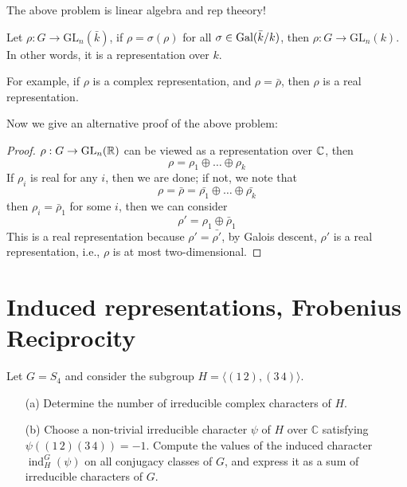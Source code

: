 \begin{warn}
    The above problem is linear algebra and rep theeory!
\end{warn}


\begin{prop}
    Let $\rho:G\to\text{GL}_n(\bar{k})$, if $\rho=\sigma(\rho)$ for all $\sigma\in\text{Gal}(\bar{k}/k)$, then $\rho: G\to\text{GL}_n(k)$. In other words, it is a representation over $k$. 

    For example, if $\rho$ is a complex representation, and $\rho=\bar{\rho}$, then $\rho$ is a real representation.
\end{prop}


Now we give an alternative proof of the above problem:
\begin{proof}
    $\rho:G\to\text{GL}_n(\mathbb{R})$ can be viewed as a representation over $\mathbb{C}$, then 
    \begin{equation*}
        \rho=\rho_1\oplus\dots\oplus\rho_k
    \end{equation*}
    If $\rho_i$ is real for any $i$, then we are done; if not, we note that 
    \begin{equation*}
        \rho=\bar{\rho}=\bar{\rho_1}\oplus\dots\oplus\bar{\rho_k}
    \end{equation*}
    then $\rho_i=\bar{\rho}_1$ for some $i$, then we can consider 
    \begin{equation*}
        \rho'=\rho_1\oplus\bar{\rho}_1
    \end{equation*}
    This is a real representation because $\rho'=\bar{\rho'}$, by Galois descent, $\rho'$ is a real representation, i.e., $\rho$ is at most two-dimensional.
\end{proof}



\section{Induced representations, Frobenius Reciprocity}


\begin{prob}[S2009-Q6]
    Let \( G = S_4 \) and consider the subgroup \( H = \langle (1\,2), (3\,4) \rangle \).
    
    \begin{enumerate}
        \item[(a)] Determine the number of irreducible complex characters of \( H \).
        
        \item[(b)] Choose a non-trivial irreducible character \( \psi \) of \( H \) over \( \mathbb{C} \) satisfying \( \psi((1\,2)(3\,4)) = -1 \). Compute the values of the induced character \( \operatorname{ind}_H^G(\psi) \) on all conjugacy classes of \( G \), and express it as a sum of irreducible characters of \( G \).
    \end{enumerate}
\end{prob}

